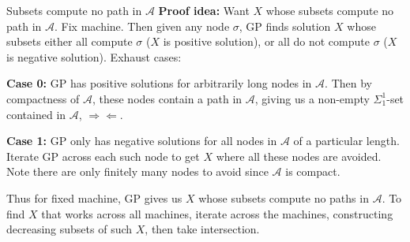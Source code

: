 \begin{frame}{Subsets compute no path in $\mathcal{A}$}
  \textbf{Proof idea:} Want $X$ whose subsets compute no path in 
  $\mathcal{A}$. Fix machine. Then given any node $\sigma$, GP finds
  solution $X$ whose subsets either all compute $\sigma$ ($X$ is positive
  solution), or all do not compute $\sigma$ ($X$ is negative solution).
  Exhaust cases:

  \vspace{1em}
  \textbf{Case 0:} GP has positive solutions for arbitrarily long nodes in
  $\mathcal{A}$. Then by compactness of $\mathcal{A}$, these nodes contain
  a path in $\mathcal{A}$, giving us a non-empty $\Sigma_1^1$-set contained
  in $\mathcal{A}$, $\Rightarrow\Leftarrow$.

  \vspace{0.5em}
  \textbf{Case 1:} GP only has negative solutions for all nodes in
  $\mathcal{A}$ of a particular length. Iterate GP across each such node to
  get $X$ where all these nodes are avoided. Note there are only finitely
  many nodes to avoid since $\mathcal{A}$ is compact.


  \vspace{1em}
  Thus for fixed machine, GP gives us $X$ whose subsets compute no paths in
  $\mathcal{A}$. To find $X$ that works across all machines, iterate across
  the machines, constructing decreasing subsets of such $X$, then take
  intersection.
\end{frame}

